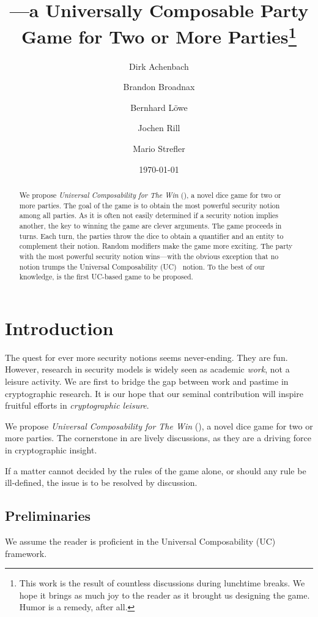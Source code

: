 \documentclass{llncs}
\title{\ucftw---a Universally Composable Party Game for Two or More Parties\thanks{This work is the result of countless discussions during lunchtime breaks. We hope it brings as much joy to the reader as it brought us designing the game. Humor is a remedy, after all.}}
\date{\today}
\author{Dirk Achenbach\inst{1} \and Brandon Broadnax\inst{1} \and Bernhard Löwe\inst{1} \and Jochen Rill\inst{2} \and Mario Strefler\inst{1}}
\institute{Karlsruhe Institute of Technology~(KIT) \and FZI Forschungszentrum Informatik}
\begin{document}
\maketitle
\begin{abstract}
	We propose \emph{Universal Composability for The Win} (\ucftw), a novel dice game for two or more parties. 
	The goal of the game is to obtain the most powerful security notion among all parties. 
	As it is often not easily determined if a security notion implies another, the key to winning the game are clever arguments.
	The game proceeds in turns. 
	Each turn, the parties throw the dice to obtain a quantifier and an entity to complement their notion. 
	Random modifiers make the game more exciting.
	The party with the most powerful security notion wins---with the obvious exception that no notion trumps the Universal Composability (UC)~\cite{can01,can05,can13} notion.
	To the best of our knowledge, \ucftw is the first UC-based game to be proposed.
\end{abstract}

\section{Introduction}
The quest for ever more security notions seems never-ending.
They are fun.
However, research in security models is widely seen as academic \emph{work}, not a leisure activity. 
We are first to bridge the gap between work and pastime in cryptographic research.
It is our hope that our seminal contribution will inspire fruitful efforts in \emph{cryptographic leisure}.

We propose \emph{Universal Composability for The Win} (\ucftw), a novel dice game for two or more parties. 
The cornerstone in \ucftw are lively discussions, as they are a driving force in cryptographic insight.


\begin{theorem}
  If a matter cannot decided by the rules of the game alone, or should any rule be ill-defined, the issue is to be resolved by discussion.
\end{theorem}

\subsection{Preliminaries}
We assume the reader is proficient in the Universal Composability (UC)~\cite{can01,can05,can13} framework.
\end{document}
